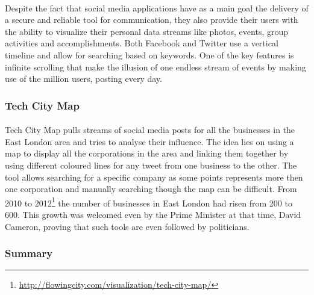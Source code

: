 \documentclass{l4proj}
\begin{document}
\paragraph{}
Despite the fact that social media applications have as a main goal the delivery of a secure and reliable tool for communication, they also provide their users with the ability to visualize their personal data streams like photos, events, group activities and accomplishments. Both Facebook and Twitter use a vertical timeline and allow for searching based on keywords. One of the key features is infinite scrolling that make the illusion of one endless stream of events by making use of the million users, posting every day. 

\subsubsection{Tech City Map}
\paragraph{}
Tech City Map pulls streams of social media posts for all the businesses in the East London area and tries to analyse their influence. The idea lies on using a map to display all the corporations in the area and linking them together by using different coloured lines for any tweet from one business to the other. The tool allows searching for a specific company as some points represents more then one corporation and manually searching though the map can be difficult. From 2010 to 2012\footnote{\url{http://flowingcity.com/visualization/tech-city-map/}} the number of businesses in East London had risen from 200 to 600. This growth was welcomed even by the Prime Minister at that time, David Cameron, proving that such tools are even followed by politicians. 

\subsubsection{Summary}
\label{subsubsec:conclusion}
\end{document}
